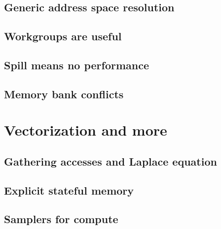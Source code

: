 \documentclass[a4paper,12pt,oneside]{article}
\begin{document}

\subsection{Generic address space resolution}\label{subsec:GenAddr}


\subsection{Workgroups are useful}\label{subsec:Wgroups}


\subsection{Spill means no performance}\label{subsec:Spills}


\subsection{Memory bank conflicts}\label{subsec:Banks}


\section{Vectorization and more}\label{sec:Vectors}


\subsection{Gathering accesses and Laplace equation}\label{subsec:Laplace}


\subsection{Explicit stateful memory}\label{subsec:Stateful}


\subsection{Samplers for compute}\label{subsec:Samplers}

\end{document}
